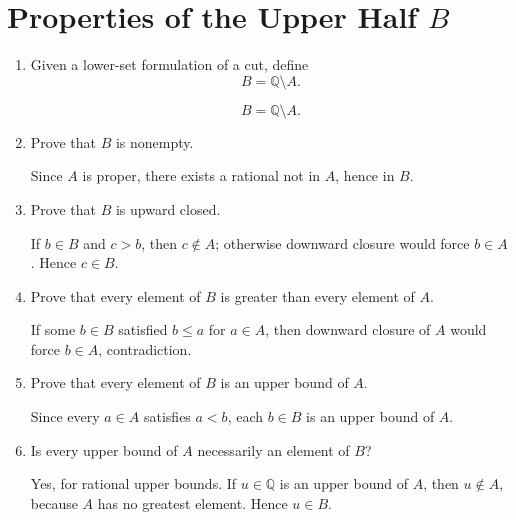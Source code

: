 \documentclass{self-check}
\begin{document}
\section{Properties of the Upper Half \texorpdfstring{$B$}{B}}

\begin{enumerate}[label=\arabic*., itemsep=10pt]

\item Given a lower-set formulation of a cut, define
\[
B=\mathbb{Q}\setminus A.
\]

\begin{answer}
\[
B=\mathbb{Q}\setminus A.
\]
\end{answer}

\item Prove that $B$ is nonempty.

\begin{answer}
Since $A$ is proper, there exists a rational not in $A$, hence in $B$.
\end{answer}

\item Prove that $B$ is upward closed.

\begin{answer}
If $b\in B$ and $c>b$, then $c\notin A$; otherwise downward closure would force $b\in A$. Hence $c\in B$.
\end{answer}

\item Prove that every element of $B$ is greater than every element of $A$.

\begin{answer}
If some $b\in B$ satisfied $b\le a$ for $a\in A$, then downward closure of $A$ would force $b\in A$, contradiction.
\end{answer}

\item Prove that every element of $B$ is an upper bound of $A$.

\begin{answer}
Since every $a\in A$ satisfies $a<b$, each $b\in B$ is an upper bound of $A$.
\end{answer}

\item Is every upper bound of $A$ necessarily an element of $B$?

\begin{answer}
Yes, for rational upper bounds. If $u\in\mathbb{Q}$ is an upper bound of $A$, then $u\notin A$, because $A$ has no greatest element. Hence $u\in B$.
\end{answer}


\end{enumerate}
\end{document}
